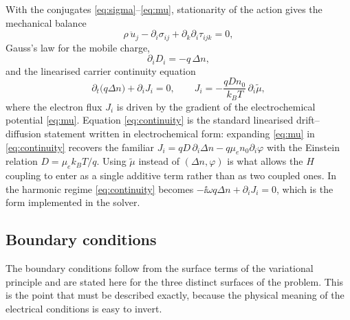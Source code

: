 With the conjugates \eqref{eq:sigma}--\eqref{eq:mu}, stationarity of the action
gives the mechanical balance
\begin{equation}
\label{eq:momentum}
\rho\,\ddot u_j-\partial_i\sigma_{ij}+\partial_k\partial_i\tau_{ijk}=0,
\end{equation}
Gauss's law for the mobile charge,
\begin{equation}
\label{eq:gauss}
\partial_iD_i=-q\,\Delta n,
\end{equation}
and the linearised carrier continuity equation
\begin{equation}
\label{eq:continuity}
\partial_t\bigl(q\Delta n\bigr)+\partial_iJ_i=0,
\qquad
J_i=-\frac{qDn_0}{k_BT}\,\partial_i\widetilde\mu ,
\end{equation}
where the electron flux $J_i$ is driven by the gradient of the electrochemical
potential \eqref{eq:mu}.  Equation \eqref{eq:continuity} is the standard
linearised drift--diffusion statement written in electrochemical form: expanding
\eqref{eq:mu} in \eqref{eq:continuity} recovers the familiar
$J_i=qD\,\partial_i\Delta n-q\mu_e n_0\partial_i\varphi$ with the Einstein
relation $D=\mu_e k_BT/q$.  Using $\widetilde\mu$ instead of $(\Delta n,\varphi)$
is what allows the $H$ coupling to enter as a single additive term rather than
as two coupled ones.  In the harmonic regime \eqref{eq:continuity} becomes
$-\ii\omega q\Delta n+\partial_iJ_i=0$, which is the form implemented in the
solver.

\subsection{Boundary conditions}
\label{sec:governing_bc}

The boundary conditions follow from the surface terms of the variational
principle and are stated here for the three distinct surfaces of the problem.
This is the point that must be described exactly, because the physical meaning
of the electrical conditions is easy to invert.

